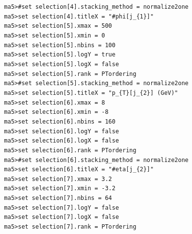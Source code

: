 \documentclass[a4paper, 10pt]{article}
\begin{document}
\texttt{ }\texttt{ }\texttt{ma5>\#set selection[4].stacking\_method = normalize2one\\
}
\texttt{ }\texttt{ }\texttt{ma5>set selection[4].titleX = "\#phi[j\_\{1\}]"\\
}
\texttt{ }\texttt{ }\texttt{ma5>set selection[5].xmax = 500\\
}
\texttt{ }\texttt{ }\texttt{ma5>set selection[5].xmin = 0\\
}
\texttt{ }\texttt{ }\texttt{ma5>set selection[5].nbins = 100\\
}
\texttt{ }\texttt{ }\texttt{ma5>set selection[5].logY = true\\
}
\texttt{ }\texttt{ }\texttt{ma5>set selection[5].logX = false\\
}
\texttt{ }\texttt{ }\texttt{ma5>set selection[5].rank = PTordering\\
}
\texttt{ }\texttt{ }\texttt{ma5>\#set selection[5].stacking\_method = normalize2one\\
}
\texttt{ }\texttt{ }\texttt{ma5>set selection[5].titleX = "p\_\{T\}[j\_\{2\}] (GeV)"\\
}
\texttt{ }\texttt{ }\texttt{ma5>set selection[6].xmax = 8\\
}
\texttt{ }\texttt{ }\texttt{ma5>set selection[6].xmin = -8\\
}
\texttt{ }\texttt{ }\texttt{ma5>set selection[6].nbins = 160\\
}
\texttt{ }\texttt{ }\texttt{ma5>set selection[6].logY = false\\
}
\texttt{ }\texttt{ }\texttt{ma5>set selection[6].logX = false\\
}
\texttt{ }\texttt{ }\texttt{ma5>set selection[6].rank = PTordering\\
}
\texttt{ }\texttt{ }\texttt{ma5>\#set selection[6].stacking\_method = normalize2one\\
}
\texttt{ }\texttt{ }\texttt{ma5>set selection[6].titleX = "\#eta[j\_\{2\}]"\\
}
\texttt{ }\texttt{ }\texttt{ma5>set selection[7].xmax = 3.2\\
}
\texttt{ }\texttt{ }\texttt{ma5>set selection[7].xmin = -3.2\\
}
\texttt{ }\texttt{ }\texttt{ma5>set selection[7].nbins = 64\\
}
\texttt{ }\texttt{ }\texttt{ma5>set selection[7].logY = false\\
}
\texttt{ }\texttt{ }\texttt{ma5>set selection[7].logX = false\\
}
\texttt{ }\texttt{ }\texttt{ma5>set selection[7].rank = PTordering\\
}
\end{document}
